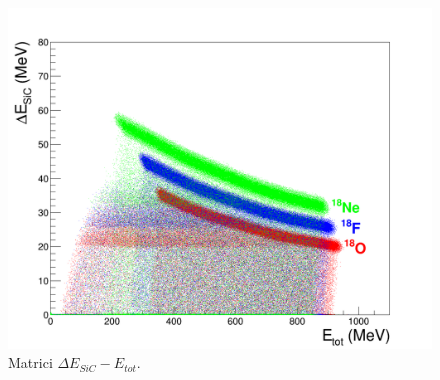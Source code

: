 \subsection{} \label{par:particelle_non_monocromatiche}



\begin{figure} [!t]
	\centering
	\includegraphics[width=\textwidth, keepaspectratio]{Grafici_Tesi/Particelle_non_monocromatiche/deltaE_ETot_full_energy.png}
	\caption{Matrici $\Delta E_{SiC} - E_{tot}$.} \label{fig:deltaE_ETot_full_energy}
\end{figure}



